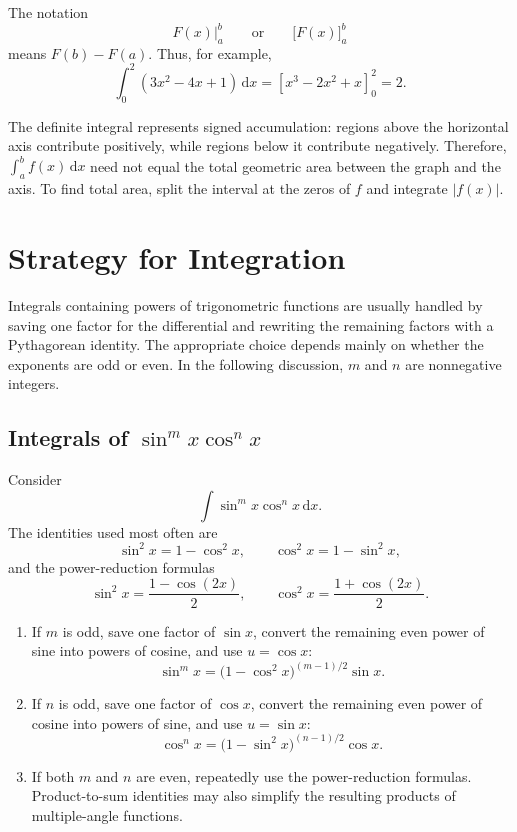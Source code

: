 The notation
\[
    \left.F(x)\right|_a^b
    \qquad\text{or}\qquad
    \bigl[F(x)\bigr]_a^b
\]
means \(F(b)-F(a)\).  Thus, for example,
\[
    \int_0^2 (3x^2-4x+1)\,\mathrm{d}x
    =\left[x^3-2x^2+x\right]_0^2
    =2.
\]

\begin{remark}
    The definite integral represents signed accumulation: regions above the
    horizontal axis contribute positively, while regions below it contribute
    negatively.  Therefore, \(\int_a^b f(x)\,\mathrm{d}x\) need not equal
    the total geometric area between the graph and the axis.  To find total
    area, split the interval at the zeros of \(f\) and integrate
    \(\lvert f(x)\rvert\).
\end{remark}

\section{Strategy for Integration}

Integrals containing powers of trigonometric functions are usually handled
by saving one factor for the differential and rewriting the remaining
factors with a Pythagorean identity.  The appropriate choice depends mainly
on whether the exponents are odd or even.  In the following discussion,
\(m\) and \(n\) are nonnegative integers.

\subsection{Integrals of \(\sin^m x\cos^n x\)}

Consider
\[
    \int \sin^m x\cos^n x\,\mathrm{d}x.
\]
The identities used most often are
\[
    \sin^2x=1-\cos^2x,
    \qquad
    \cos^2x=1-\sin^2x,
\]
and the power-reduction formulas
\[
    \sin^2x=\frac{1-\cos(2x)}{2},
    \qquad
    \cos^2x=\frac{1+\cos(2x)}{2}.
\]

\begin{enumerate}
    \item If \(m\) is odd, save one factor of \(\sin x\), convert the
    remaining even power of sine into powers of cosine, and use
    \(u=\cos x\):
    \[
        \sin^m x
        =\bigl(1-\cos^2x\bigr)^{(m-1)/2}\sin x.
    \]

    \item If \(n\) is odd, save one factor of \(\cos x\), convert the
    remaining even power of cosine into powers of sine, and use
    \(u=\sin x\):
    \[
        \cos^n x
        =\bigl(1-\sin^2x\bigr)^{(n-1)/2}\cos x.
    \]

    \item If both \(m\) and \(n\) are even, repeatedly use the
    power-reduction formulas.  Product-to-sum identities may also simplify
    the resulting products of multiple-angle functions.
\end{enumerate}

